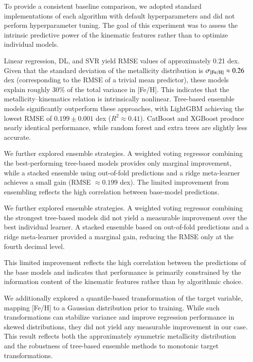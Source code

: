 \documentclass{aa}
\begin{document}
To provide a consistent baseline comparison, we adopted standard implementations of each algorithm with default hyperparameters and did not perform hyperparameter tuning. The goal of this experiment was to assess the intrinsic predictive power of the kinematic features
rather than to optimize individual models.

Linear regression, DL, and SVR yield RMSE values of approximately 0.21 dex. Given that the standard deviation of the metallicity distribution is $\sigma_{\rm [Fe/H]} \approx 0.26$ dex (corresponding to the RMSE of a trivial mean predictor), these models explain roughly 30\% of the total variance in [Fe/H]. This indicates that the metallicity–kinematics relation is intrinsically nonlinear. Tree-based ensemble models significantly outperform these approaches, with LightGBM achieving the lowest RMSE of $0.199 \pm 0.001$ dex ($R^2 \approx 0.41$). CatBoost and XGBoost produce nearly identical performance, while random forest and extra trees are slightly less accurate.

We further explored ensemble strategies. A weighted voting regressor combining the best-performing tree-based models provides only marginal improvement, while a stacked ensemble using out-of-fold predictions and a ridge meta-learner achieves a small gain (RMSE $\approx 0.199$ dex). The limited improvement from ensembling reflects the high correlation between base-model predictions.

We further explored ensemble strategies. A weighted voting regressor combining the strongest tree-based models did not yield a measurable improvement over the best individual learner. A stacked ensemble based on out-of-fold predictions and a ridge meta-learner provided a marginal gain, reducing the RMSE only at the fourth decimal level.

This limited improvement reflects the high correlation between the predictions of the base models and indicates that performance is
primarily constrained by the information content of the kinematic features rather than by algorithmic choice.

We additionally explored a quantile-based transformation of the target variable, mapping [Fe/H] to a Gaussian distribution prior to training. While such transformations can stabilize variance and improve regression performance in skewed distributions, they did not yield any measurable improvement in our case. This result reflects both the approximately symmetric metallicity distribution
and the robustness of tree-based ensemble methods to monotonic target transformations.
\end{document}
